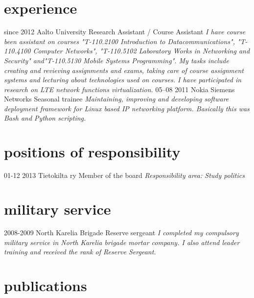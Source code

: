 \documentclass[]{friggeri-cv}
\begin{document}
\section{experience}

\begin{entrylist}
  \entry
    {since 2012}
    {Aalto University}
    {Research Assistant / Course Assistant}
    {\emph{I have course been assistant on courses "T-110.2100 Introduction to Datacommunications", "T-110.4100 Computer Networks", "T-110.5102 Laboratory Works in Networking and Security" and"T-110.5130 Mobile Systems Programming". My tasks include creating and revieving assignments and exams, taking care of course assignment systems and lecturing about technologies used on courses. I have participated in research on LTE network functions virtualization.}}
  \entry
    {05–08 2011}
    {Nokia Siemens Networks}
    {Seasonal trainee}
    {\emph{Maintaining, improving and developing software deployment framework for Linux based IP networking platform. Basically this was Bash and Python scripting.}}
\end{entrylist}

\section{positions of responsibility}
  \begin{entrylist}
    \entry
      {01-12 2013}
      {Tietokilta ry}
      {Member of the board}
      {\emph{Responsibility area: Study politics}}
  \end{entrylist}

\section{military service}
  \begin{entrylist}
    \entry
      {2008-2009}
      {North Karelia Brigade}
      {Reserve sergeant}
      {\emph{I completed my compulsory military service in North Karelia brigade mortar company. I also attend leader training and received the rank of Reserve Sergeant.}}
  \end{entrylist}

\section{publications}
\end{document}
